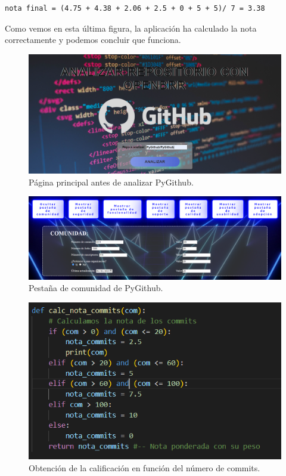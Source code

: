 \documentclass[a4paper, 12pt]{book}
\begin{document}
\begin{verbatim}
nota final = (4.75 + 4.38 + 2.06 + 2.5 + 0 + 5 + 5)/ 7 = 3.38
\end{verbatim}

Como vemos en esta última figura, la aplicación ha calculado la nota correctamente y podemos concluir que funciona.

\begin{figure}
    \centering
    \includegraphics[width=1\textwidth, keepaspectratio]{img/principal_main.png}
    \caption{Página principal antes de analizar PyGithub.}\label{fig:pricipal_pygithub}
\end{figure}

\begin{figure}
    \centering
    \includegraphics[width=1\textwidth, keepaspectratio]{img/pygithub_comunidad.png}
    \caption{Pestaña de comunidad de PyGithub.}\label{fig:comunidad_pygithub}
\end{figure}

\begin{figure}
    \centering
    \includegraphics[width=1\textwidth, keepaspectratio]{img/nota_commits.png}
    \caption{Obtención de la calificación en función del número de commits.}\label{fig:nota_commits}
\end{figure}
\end{document}
